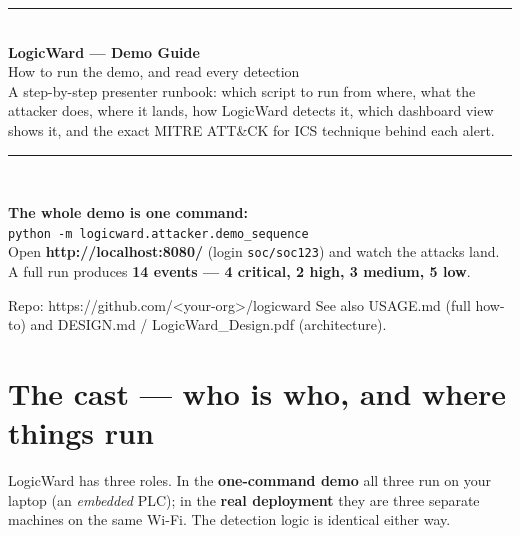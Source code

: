 \documentclass[11pt,a4paper]{article}
\newcommand{\code}[1]{\texttt{\small #1}}
\begin{document}
\begin{titlepage}
\thispagestyle{empty}
\vspace*{1.4cm}
{\color{navy}\rule{\textwidth}{2.5pt}}\\[0.5cm]
{\Huge\bfseries\color{navy} LogicWard --- Demo Guide}\\[0.35cm]
{\LARGE\color{navy2} How to run the demo, and read every detection}\\[0.5cm]
{\large\color{ink} A step-by-step presenter runbook: which script to run from where,
what the attacker does, where it lands, how LogicWard detects it, which dashboard view
shows it, and the exact MITRE ATT\&CK for ICS technique behind each alert.}\\[0.4cm]
{\color{navy}\rule{\textwidth}{2.5pt}}\\[1.0cm]

\begin{note}
\large
\textbf{The whole demo is one command:}\\[4pt]
\code{python -m logicward.attacker.demo_sequence}\\[6pt]
Open \textbf{http://localhost:8080/} (login \code{soc/soc123}) and watch the attacks land.
A full run produces \textbf{14 events --- 4 critical, 2 high, 3 medium, 5 low}.
\end{note}

\vfill
{\small\color{muted} Repo: https://github.com/<your-org>/logicward \quad\textbullet\quad
See also USAGE.md (full how-to) and DESIGN.md / LogicWard\_Design.pdf (architecture).}
\end{titlepage}

\tableofcontents
\newpage

\section{The cast --- who is who, and where things run}

LogicWard has three roles. In the \textbf{one-command demo} all three run on your
laptop (an \emph{embedded} PLC); in the \textbf{real deployment} they are three separate
machines on the same Wi-Fi. The detection logic is identical either way.
\end{document}
